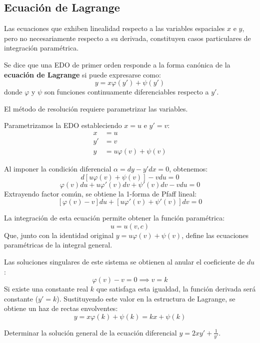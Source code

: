 \subsection{Ecuación de Lagrange}

Las ecuaciones que exhiben linealidad respecto a las variables espaciales $x$ e $y$, pero no necesariamente respecto a su derivada, constituyen casos particulares de integración paramétrica.

\begin{definicion}
Se dice que una EDO de primer orden responde a la forma canónica de la \textbf{ecuación de Lagrange} si puede expresarse como:
$$ y = x \varphi(y') + \psi(y') $$
donde $\varphi$ y $\psi$ son funciones continuamente diferenciables respecto a $y'$.
\end{definicion}

El método de resolución requiere parametrizar las variables. 

\begin{tcolorbox}[recuadro={Resolución paramétrica de la ecuación de Lagrange}]
Parametrizamos la EDO estableciendo $x = u$ e $y' = v$:
\begin{align*}
    x &= u \\
    y' &= v \\
    y &= u \varphi(v) + \psi(v)
\end{align*}

Al imponer la condición diferencial $\alpha = dy - y'dx = 0$, obtenemos:
$$ d[u \varphi(v) + \psi(v)] - v du = 0 $$
$$ \varphi(v)du + u \varphi'(v)dv + \psi'(v)dv - v du = 0 $$
Extrayendo factor común, se obtiene la 1-forma de Pfaff lineal:
$$
    [\varphi(v) - v]du + [u \varphi'(v) + \psi'(v)]dv = 0
$$

La integración de esta ecuación permite obtener la función paramétrica:
$$
    u = u(v, c)
$$
Que, junto con la identidad original $y = u \varphi(v) + \psi(v)$, define las ecuaciones paramétricas de la integral general.

Las soluciones singulares de este sistema se obtienen al anular el coeficiente de $du$:
$$ \varphi(v) - v = 0 \implies v = k $$
Si existe una constante real $k$ que satisfaga esta igualdad, la función derivada será constante ($y' = k$). Sustituyendo este valor en la estructura de Lagrange, se obtiene un haz de rectas envolventes:
$$ y = x \varphi(k) + \psi(k) = kx + \psi(k) $$
\end{tcolorbox}


\begin{ejercicio}
Determinar la solución general de la ecuación diferencial $y = 2xy' + \frac{1}{y'}$.
\end{ejercicio}

